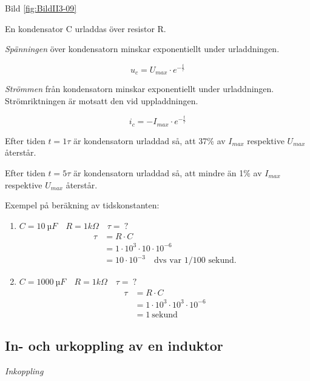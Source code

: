 Bild \ref{fig:BildII3-09}

En kondensator C urladdas över resistor R.

\emph{Spänningen} över kondensatorn minskar exponentiellt under urladdningen.

\[u_c = U_{max} \cdot e^{-\frac{t}{\tau}}\]

\emph{Strömmen} från kondensatorn minskar exponentiellt under urladdningen.
Strömriktningen är motsatt den vid uppladdningen.

\[i_c = - I_{max} \cdot e^{-\frac{t}{\tau}}\]

Efter tiden \(t = 1\tau\) är kondensatorn urladdad så, att 37\% av \(I_{max}\)
respektive \(U_{max}\) återstår.

Efter tiden \(t = 5\tau\) är kondensatorn urladdad så, att mindre än 1\% av
\(I_{max}\) respektive \(U_{max}\) återstår.

Exempel på beräkning av tidskonstanten:
\begin{enumerate}
\item \(C = 10\ µF \quad R = 1 kΩ \quad \tau =\ ?\)
  \begin{align*}
    \tau &= R \cdot C \\
    &= 1 \cdot 10^3 \cdot 10 \cdot 10^{-6} \\
    &= 10 \cdot 10^{-3} \quad \text{dvs var 1/100 sekund.}
  \end{align*}
\item \(C = 1000\ µF \quad R = 1 kΩ \quad \tau =\ ?\)
  \begin{align*}
    \tau &= R \cdot C \\
    &= 1 \cdot 10^3 \cdot 10^3 \cdot 10^{-6} \\
    &= 1\ \text{sekund}
  \end{align*}
\end{enumerate}

\subsection{In- och urkoppling av en induktor}

\emph{Inkoppling}

